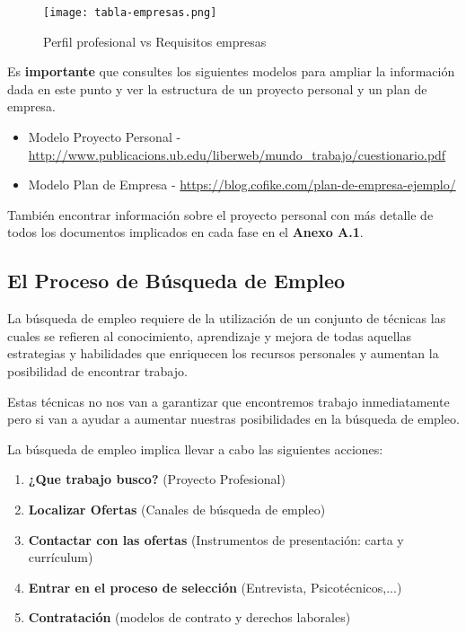 \vspace{10ex}

\begin{figure}[ht]
    \centering
    \texttt{[image: tabla-empresas.png]}
    \caption{Perfil profesional vs Requisitos empresas}
    \label{tab:emp}
\end{figure}

Es \textbf{importante} que consultes los siguientes modelos para ampliar la información dada en este punto y ver la estructura de un proyecto personal y un plan de empresa.

\begin{itemize}
    \item Modelo Proyecto Personal - \url{http://www.publicacions.ub.edu/liberweb/mundo_trabajo/cuestionario.pdf}
    \item Modelo Plan de Empresa - \url{https://blog.cofike.com/plan-de-empresa-ejemplo/}
\end{itemize}

También encontrar información sobre el proyecto personal con más detalle de todos los documentos implicados en cada fase en el \textbf{Anexo A.1}.

\subsection{El Proceso de Búsqueda de Empleo}
La búsqueda de empleo requiere de la utilización de un conjunto de técnicas las cuales se refieren al conocimiento, aprendizaje y mejora de todas aquellas estrategias y habilidades que enriquecen los recursos personales y aumentan la posibilidad de encontrar trabajo.

Estas técnicas no nos van a garantizar que encontremos trabajo inmediatamente pero si van a ayudar a aumentar nuestras posibilidades en la búsqueda de empleo.

La búsqueda de empleo implica llevar a cabo las siguientes acciones:

\begin{enumerate}
    \item \textbf{¿Que trabajo busco?} (Proyecto Profesional)
    \item \textbf{Localizar Ofertas} (Canales de búsqueda de empleo)
    \item \textbf{Contactar con las ofertas} (Instrumentos de presentación: carta y currículum)
    \item \textbf{Entrar en el proceso de selección} (Entrevista, Psicotécnicos,...)
    \item \textbf{Contratación} (modelos de contrato y derechos laborales)
\end{enumerate}

